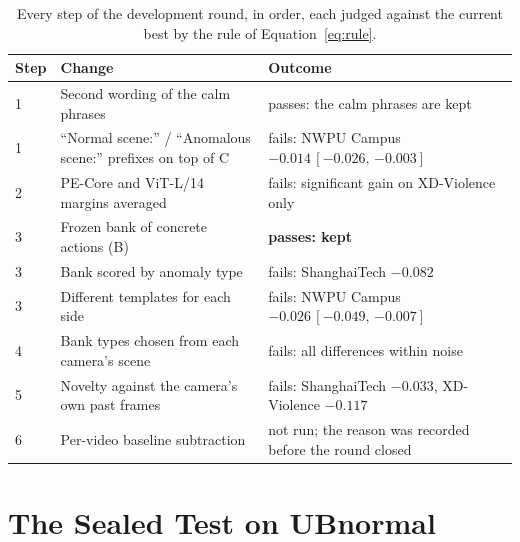 \documentclass[a4paper,fleqn]{cas-sc}
\newcommand{\ci}[2]{\,[{#1},\,{#2}]}
\begin{document}
\begin{table}[width=\linewidth,cols=3,pos=htbp]
\caption{Every step of the development round, in order, each judged against the
current best by the rule of Equation~\eqref{eq:rule}.}\label{tbl:round}
\small
\begin{tabularx}{\linewidth}{@{}l Z Z@{}}
\toprule
\textbf{Step} & \textbf{Change} & \textbf{Outcome} \\
 & Second wording of the calm phrases & passes: the calm phrases are kept \\
1 & ``Normal scene:'' / ``Anomalous scene:'' prefixes on top of C & fails: NWPU Campus $-0.014\ci{-0.026}{-0.003}$ \\
2 & PE-Core and ViT-L/14 margins averaged & fails: significant gain on XD-Violence only \\
3 & Frozen bank of concrete actions (B) & \textbf{passes: kept} \\
3 & Bank scored by anomaly type & fails: ShanghaiTech $-0.082$ \\
3 & Different templates for each side \citep{lee2025flashback} & fails: NWPU Campus $-0.026\ci{-0.049}{-0.007}$ \\
4 & Bank types chosen from each camera's scene & fails: all differences within noise \\
5 & Novelty against the camera's own past frames & fails: ShanghaiTech $-0.033$, XD-Violence $-0.117$ \\
6 & Per-video baseline subtraction & not run; the reason was recorded before the round closed \\
\bottomrule
\end{tabularx}
\end{table}

\section{The Sealed Test on UBnormal}
\label{sec:sealed}
\end{document}
